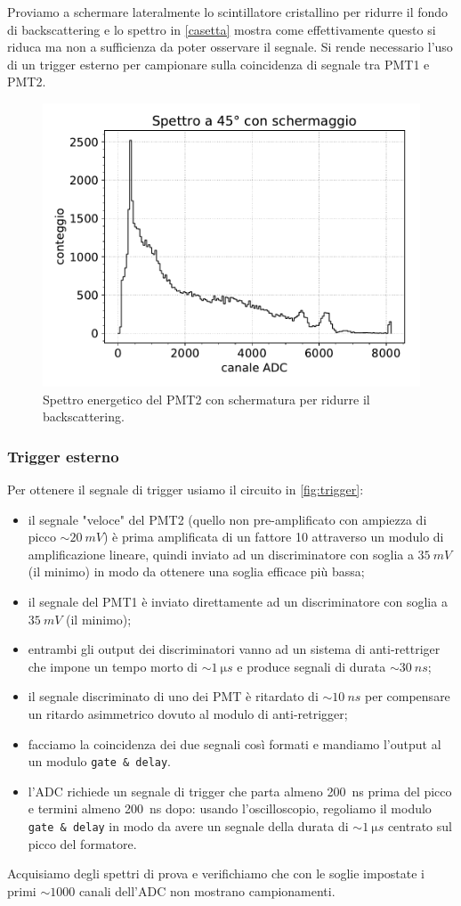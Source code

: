 Proviamo a schermare lateralmente lo scintillatore cristallino per ridurre il fondo di backscattering e lo spettro in \autoref{casetta} mostra come effettivamente questo si riduca ma non a sufficienza da poter osservare il segnale. Si rende necessario l'uso di un trigger esterno per campionare sulla coincidenza di segnale tra PMT1 e PMT2.

\begin{figure}
\centering
\includegraphics[width=25 em]{45gs}
\caption{Spettro energetico del PMT2 con schermatura per ridurre il backscattering.}
\label{casetta}
\end{figure}

\subsubsection{Trigger esterno}
Per ottenere il segnale di trigger usiamo il circuito in \autoref{fig:trigger}:
\begin{itemize}
	\item il segnale "veloce" del PMT2 (quello non pre-amplificato con ampiezza di picco $\sim\SI{20}{mV}$) è prima amplificata di un fattore 10 attraverso un modulo di amplificazione lineare, quindi inviato ad un discriminatore con soglia a $\SI{35}{mV}$ (il minimo) in modo da ottenere una soglia efficace più bassa;
	\item il segnale del PMT1 è inviato direttamente ad un discriminatore con soglia a $\SI{35}{mV}$ (il minimo);
	\item entrambi gli output dei discriminatori vanno ad un sistema di anti-rettriger che impone un tempo morto di $\sim\SI{1}{\micro s}$ e produce segnali di durata $\sim\SI{30}{ns}$;
	\item il segnale discriminato di uno dei PMT è ritardato di $\sim\SI{10}{ns}$ per compensare un ritardo asimmetrico dovuto al modulo di anti-retrigger;
	\item facciamo la coincidenza dei due segnali così formati e mandiamo l'output al un modulo \texttt{gate \& delay}.
	\item l'ADC richiede un segnale di trigger che parta almeno \SI{200}{ns} prima del picco e termini almeno \SI{200}{ns} dopo: usando l'oscilloscopio, regoliamo il modulo \texttt{gate \& delay} in modo da avere un segnale della durata di $\sim\SI{1}{\micro s}$ centrato sul picco del formatore.
\end{itemize}
Acquisiamo degli spettri di prova e verifichiamo che con le soglie impostate i primi $\sim1000$ canali dell'ADC non mostrano campionamenti.

